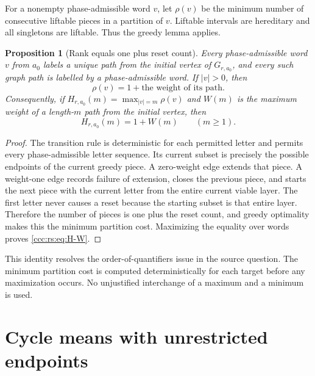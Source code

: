 \documentclass[11pt,letterpaper]{article}
\newtheorem{proposition}[theorem]{Proposition}
\theoremstyle{definition}
\theoremstyle{remark}
\begin{document}
For a nonempty phase-admissible word $v$, let $\rho(v)$ be the minimum number of consecutive liftable pieces in a partition of $v$. Liftable intervals are hereditary and all singletons are liftable. Thus the greedy lemma applies.

\begin{proposition}[Rank equals one plus reset count]\label{ccc:rs:prop:reset}
Every phase-admissible word $v$ from $a_0$ labels a unique path from the initial vertex of $G_{r,a_0}$, and every such graph path is labelled by a phase-admissible word. If $|v|>0$, then
\[
\rho(v)=1+\text{the weight of its path}.
\]
Consequently, if $H_{r,a_0}(m)=\max_{|v|=m}\rho(v)$ and $W(m)$ is the maximum weight of a length-$m$ path from the initial vertex, then
\begin{equation}\label{ccc:rs:eq:H-W}
H_{r,a_0}(m)=1+W(m)\qquad(m\ge1).
\end{equation}
\end{proposition}
\begin{proof}
The transition rule is deterministic for each permitted letter and permits every phase-admissible letter sequence. Its current subset is precisely the possible endpoints of the current greedy piece. A zero-weight edge extends that piece. A weight-one edge records failure of extension, closes the previous piece, and starts the next piece with the current letter from the entire current viable layer. The first letter never causes a reset because the starting subset is that entire layer. Therefore the number of pieces is one plus the reset count, and greedy optimality makes this the minimum partition cost. Maximizing the equality over words proves \eqref{ccc:rs:eq:H-W}.
\end{proof}

This identity resolves the order-of-quantifiers issue in the source question. The minimum partition cost is computed deterministically for each target before any maximization occurs. No unjustified interchange of a maximum and a minimum is used.

\section{Cycle means with unrestricted endpoints}\label{ccc:rs:sec:cycle}
\end{document}
